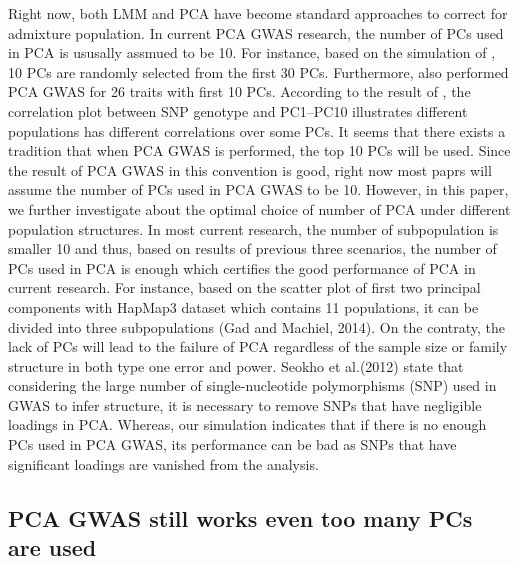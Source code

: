 \documentclass[12pt]{article}
\begin{document}
Right now, both LMM and PCA have become standard approaches to correct for admixture population. In current PCA GWAS research, the number of PCs used in PCA is ususally assmued to be 10.
For instance, based on the simulation of \citet{hoffman_correcting_2013}, 10 PCs are randomly selected from the first 30 PCs.
Furthermore, \citet{wojcik_genetic_2019} also performed PCA GWAS for 26 traits with first 10 PCs.
According to the result of \citet{wojcik_genetic_2019}, the correlation plot between SNP genotype and PC1–PC10 illustrates different populations has different correlations over some PCs.
It seems that there exists a tradition that when PCA GWAS is performed, the top 10 PCs will be used.
Since the result of PCA GWAS in this convention is good, right now most paprs will assume the number of PCs used in PCA GWAS to be 10.
However, in this paper, we further investigate about the optimal choice of number of PCA under different population structures.
In most current research, the number of subpopulation is smaller 10 and thus, based on results of previous three scenarios, the number of PCs used in PCA is enough which certifies the good performance of PCA  in current research.
For instance, based on the scatter plot of first two principal components with HapMap3 dataset which contains 11 populations, it can be divided into three subpopulations (Gad and Machiel, 2014).
On the contraty, the lack of PCs will lead to the failure of PCA regardless of the sample size or family structure in both type one error and power.
Seokho et al.(2012) state that considering the large number of single-nucleotide polymorphisms (SNP) used in GWAS to infer structure, it is necessary to remove SNPs that have negligible loadings in PCA.
Whereas, our simulation indicates that if there is no enough PCs used in PCA GWAS, its performance can be bad as SNPs that have significant loadings are vanished from the analysis.


\subsection{PCA GWAS still works even too many PCs are used}
\end{document}
